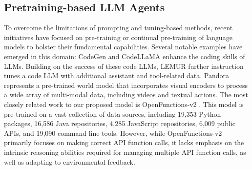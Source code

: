 \subsection{Pretraining-based LLM Agents} 

To overcome the limitations of prompting and tuning-based methods, recent initiatives have focused on pre-training or continual pre-training of language models to bolster their fundamental capabilities. Several notable examples have emerged in this domain:
CodeGen \citep{nijkamp2023codegen} and CodeLLaMA \citep{roziere2023code} enhance the coding skills of LLMs. Building on the success of these code LLMs, LEMUR \citep{xu2024lemur} further instruction tunes a code LLM with additional assistant and tool-related data.
Pandora \citep{xiang2024pandora} represents a pre-trained world model that incorporates visual encoders to process a wide array of multi-modal data, including videos and textual actions.
The most closely related work to our proposed model is OpenFunctions-v2 \citep{patil2023gorilla}. This model is pre-trained on a vast collection of data sources, including 19,353 Python packages, 16,586 Java repositories, 4,285 JavaScript repositories, 6,009 public APIs, and 19,090 command line tools. However, while OpenFunctions-v2 primarily focuses on making correct API function calls, it lacks emphasis on the intrinsic reasoning abilities required for managing multiple API function calls, as well as adapting to environmental feedback.
